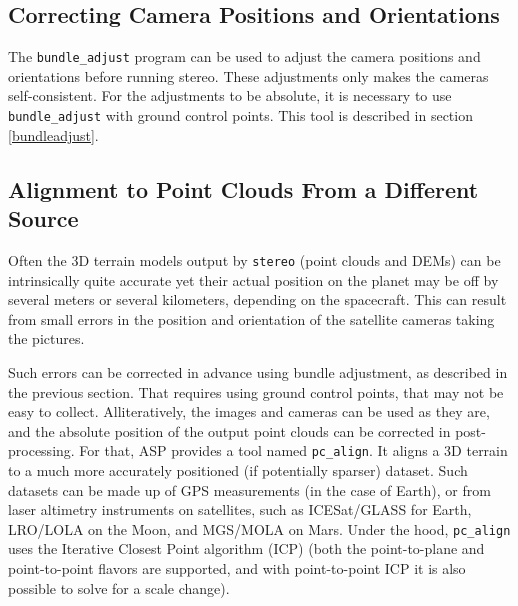 %

\newpage

\subsection{Correcting Camera Positions and Orientations}

The \texttt{bundle\_adjust} program can be used to adjust the camera
positions and orientations before running stereo. These adjustments only
makes the cameras self-consistent. For the adjustments to be absolute,
it is necessary to use \texttt{bundle\_adjust} with ground control
points. This tool is described in section \ref{bundleadjust}.

\subsection{Alignment to Point Clouds From a Different Source}
\label{pc-align-example}
Often the 3D terrain models output by \texttt{stereo} (point
clouds and DEMs) can be intrinsically quite accurate yet their actual
position on the planet may be off by several meters or several
kilometers, depending on the spacecraft. This can result from small
errors in the position and orientation of the satellite cameras taking
the pictures.

Such errors can be corrected in advance using bundle adjustment, as
described in the previous section. That requires using ground control
points, that may not be easy to collect. Alliteratively, the images and
cameras can be used as they are, and the absolute position of the output
point clouds can be corrected in post-processing. For that, ASP provides
a tool named \texttt{pc\_align}. It aligns a 3D terrain to a much more
accurately positioned (if potentially sparser) dataset. Such datasets
can be made up of GPS measurements (in the case of Earth), or from
laser altimetry instruments on satellites, such as ICESat/GLASS for
Earth, LRO/LOLA on the Moon, and MGS/MOLA on Mars.  Under the hood,
\texttt{pc\_align} uses the Iterative Closest Point algorithm (ICP)
(both the point-to-plane and point-to-point flavors are supported,
and with point-to-point ICP it is also possible to solve for a scale change).

